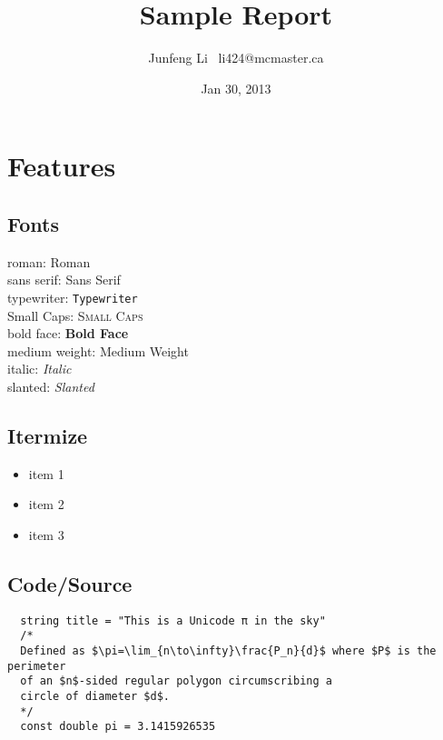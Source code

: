 \documentclass{article}
\title{Sample Report}
\author{Junfeng Li \ li424@mcmaster.ca}
\date{Jan 30, 2013}
\begin{document}
\maketitle

\section{Features}

\subsection{Fonts}
roman: \textrm{Roman} \\
sans serif: \textsf{Sans Serif} \\
typewriter: \texttt{Typewriter} \\
Small Caps: \textsc{Small Caps} \\
bold face: \textbf{Bold Face} \\
medium weight: \textmd{Medium Weight} \\
italic: \textit{Italic} \\
slanted: \textsl{Slanted} \\

\subsection{Itermize}
\begin{itemize}
\item item 1
\item item 2
\item item 3
\end{itemize}

\subsection{Code/Source}
\begin{verbatim}
  string title = "This is a Unicode π in the sky"
  /*
  Defined as $\pi=\lim_{n\to\infty}\frac{P_n}{d}$ where $P$ is the perimeter
  of an $n$-sided regular polygon circumscribing a
  circle of diameter $d$.
  */
  const double pi = 3.1415926535
\end{verbatim}
\end{document}
